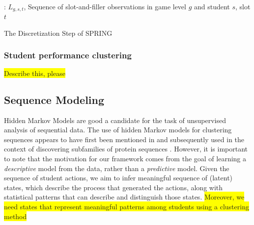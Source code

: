 \documentclass{sigchi}
\newcommand{\hl}[1]{\colorbox{yellow}{#1}}
\def\algname{SPRING\xspace}
\begin{document}
\begin{algorithm}
	\begin{algorithmic}[1]
		\Require: $L_{g,s,t}$, Sequence of slot-and-filler observations in game level $g$ and student $s$, slot $t$
		
	
		\State
					\EndIf
				\EndFor
		\EndFor
		\State {}
		\EndProcedure
		
	\end{algorithmic}
	\caption{The Discretization Step of \algname \label{alg:discretize}}
\end{algorithm}

\subsubsection{Student performance clustering}
\label{sec:student_disc}
\hl{Describe this, please}


\subsection{Sequence Modeling}
Hidden Markov Models are good a candidate for the task of unsupervised analysis of sequential data.
The use of hidden Markov models for clustering sequences appears to have first been mentioned in \cite{juang1985probabilistic} and subsequently used in the context of discovering subfamilies of protein sequences \cite{krogh1994hidden}. 
However, it is important to note that the motivation for our framework comes from the goal of learning a \textit{descriptive} model from the data, rather than a \textit{predictive} model.
Given the sequence of student actions, we aim to infer meaningful sequence of (latent) states, which describe the process that generated the actions, along with statistical patterns that can describe and distinguish those states.
\hl{Moreover, we need states that represent meaningful patterns among students using a clustering method}
\end{document}
